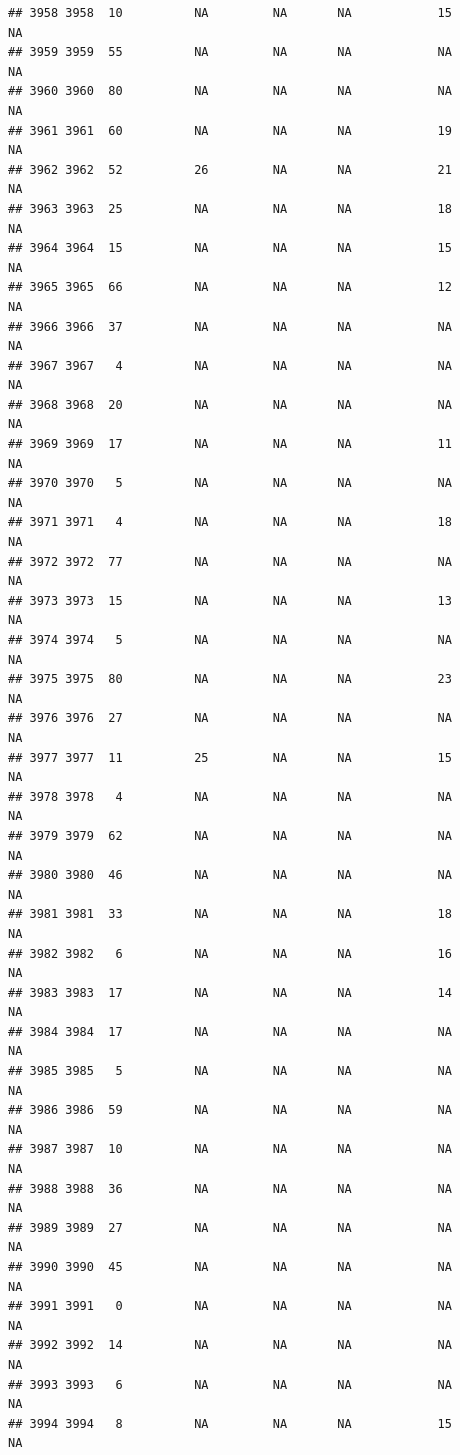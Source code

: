 \documentclass[man]{apa6}
\begin{document}
\begin{verbatim}
## 3958 3958  10          NA         NA       NA            15       NA
## 3959 3959  55          NA         NA       NA            NA       NA
## 3960 3960  80          NA         NA       NA            NA       NA
## 3961 3961  60          NA         NA       NA            19       NA
## 3962 3962  52          26         NA       NA            21       NA
## 3963 3963  25          NA         NA       NA            18       NA
## 3964 3964  15          NA         NA       NA            15       NA
## 3965 3965  66          NA         NA       NA            12       NA
## 3966 3966  37          NA         NA       NA            NA       NA
## 3967 3967   4          NA         NA       NA            NA       NA
## 3968 3968  20          NA         NA       NA            NA       NA
## 3969 3969  17          NA         NA       NA            11       NA
## 3970 3970   5          NA         NA       NA            NA       NA
## 3971 3971   4          NA         NA       NA            18       NA
## 3972 3972  77          NA         NA       NA            NA       NA
## 3973 3973  15          NA         NA       NA            13       NA
## 3974 3974   5          NA         NA       NA            NA       NA
## 3975 3975  80          NA         NA       NA            23       NA
## 3976 3976  27          NA         NA       NA            NA       NA
## 3977 3977  11          25         NA       NA            15       NA
## 3978 3978   4          NA         NA       NA            NA       NA
## 3979 3979  62          NA         NA       NA            NA       NA
## 3980 3980  46          NA         NA       NA            NA       NA
## 3981 3981  33          NA         NA       NA            18       NA
## 3982 3982   6          NA         NA       NA            16       NA
## 3983 3983  17          NA         NA       NA            14       NA
## 3984 3984  17          NA         NA       NA            NA       NA
## 3985 3985   5          NA         NA       NA            NA       NA
## 3986 3986  59          NA         NA       NA            NA       NA
## 3987 3987  10          NA         NA       NA            NA       NA
## 3988 3988  36          NA         NA       NA            NA       NA
## 3989 3989  27          NA         NA       NA            NA       NA
## 3990 3990  45          NA         NA       NA            NA       NA
## 3991 3991   0          NA         NA       NA            NA       NA
## 3992 3992  14          NA         NA       NA            NA       NA
## 3993 3993   6          NA         NA       NA            NA       NA
## 3994 3994   8          NA         NA       NA            15       NA

\end{verbatim}
\end{document}
